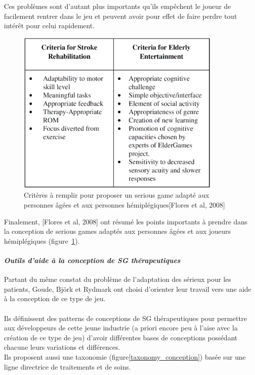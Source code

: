 Ces problèmes sont d'autant plus importants qu'ils empêchent le joueur de facilement rentrer dans le jeu et peuvent avoir pour effet de faire perdre tout intérêt pour celui rapidement.
\begin{figure}
	\centering
	\includegraphics[width=10cm]{images/param_jeux_adaptes.png}
	\caption{Critères à remplir pour proposer un serious game adapté aux personnes âgées et aux personnes hémiplégiques[Flores et al, 2008]\cite{Flor08}}
	\label{param_jeux_adaptes}
\end{figure}

Finalement, [Flores et al, 2008]\cite{Flor08} ont résumé les points importants à prendre dans la conception de serious games adaptés aux personnes âgées et aux joueurs hémiplégiques (figure~\ref{param_jeux_adaptes}).

\paragraph{\emph{Outils d'aide à la conception de SG thérapeutiques}\\}
Partant du même constat du problème de l'adaptation des sérieux pour les patients, Goude, Björk et Rydmark\cite{Goud07} ont choisi d'orienter leur travail vers une aide à la conception de ce type de jeu.

\paragraph{}
Ils définissent des patterns de conceptions de SG thérapeutiques pour permettre aux développeurs de cette jeune industrie (a priori encore peu à l'aise avec la création de ce type de jeu) d'avoir différentes bases de conceptions possédant chacune leurs variations et différences.\\
Ils proposent aussi une taxonomie (figure\ref{taxonomy_conception}) basée sur une ligne directrice de traitements et de soins. 

